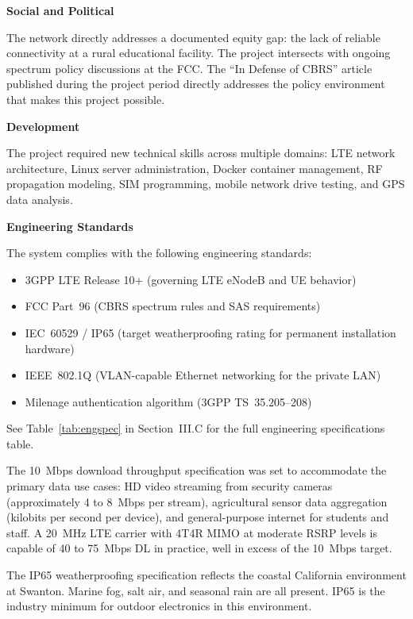 \documentclass[
    left=1.5in,
    right=1.25in,
    top=1.25in,
    bottom=1.25in
]{CalPolySeniorProject}
\begin{document}
\textbf{Social and Political}

The network directly addresses a documented equity gap: the lack of reliable
connectivity at a rural educational facility. The project intersects with ongoing
spectrum policy discussions at the FCC. The ``In Defense of CBRS'' article
\autocite{lupo2026cbrs} published during the project period directly addresses
the policy environment that makes this project possible.

\textbf{Development}

The project required new technical skills across multiple domains: LTE network
architecture, Linux server administration, Docker container management, RF
propagation modeling, SIM programming, mobile network drive testing, and GPS
data analysis.

\textbf{Engineering Standards}

The system complies with the following engineering standards:

\begin{itemize}
    \item 3GPP LTE Release 10+ (governing LTE eNodeB and UE behavior)
    \item FCC Part~96 (CBRS spectrum rules and SAS requirements)
    \item IEC~60529 / IP65 (target weatherproofing rating for permanent
    installation hardware)
    \item IEEE~802.1Q (VLAN-capable Ethernet networking for the private LAN)
    \item Milenage authentication algorithm (3GPP TS~35.205--208)
\end{itemize}


See Table~\ref{tab:engspec} in Section~III.C for the full engineering
specifications table.

The 10~Mbps download throughput specification was set to accommodate the primary
data use cases: HD video streaming from security cameras (approximately 4 to
8~Mbps per stream), agricultural sensor data aggregation (kilobits per second
per device), and general-purpose internet for students and staff. A 20~MHz LTE
carrier with 4T4R MIMO at moderate RSRP levels is capable of 40 to 75~Mbps DL
in practice, well in excess of the 10~Mbps target.

The IP65 weatherproofing specification reflects the coastal California
environment at Swanton. Marine fog, salt air, and seasonal rain are all present.
IP65 is the industry minimum for outdoor electronics in this environment.
\end{document}
